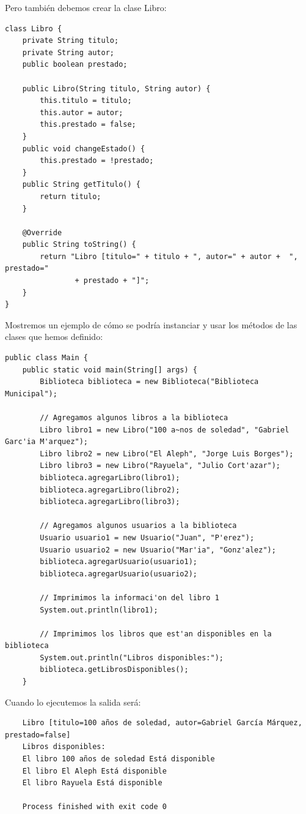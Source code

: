 \documentclass[executivepaper]{article}
\begin{document}
Pero también debemos crear la clase Libro:
\begin{lstlisting}
class Libro {
    private String titulo;
    private String autor;
    public boolean prestado;

    public Libro(String titulo, String autor) {
        this.titulo = titulo;
        this.autor = autor;
        this.prestado = false;
    }
    public void changeEstado() {
        this.prestado = !prestado;
    }
    public String getTitulo() {
        return titulo;
    }

    @Override
    public String toString() {
        return "Libro [titulo=" + titulo + ", autor=" + autor +  ", prestado="
                + prestado + "]";
    }
}
\end{lstlisting}

Mostremos un ejemplo de cómo se podría instanciar y usar los métodos de las clases que hemos definido:
\begin{lstlisting}
public class Main {
    public static void main(String[] args) {
        Biblioteca biblioteca = new Biblioteca("Biblioteca Municipal");

        // Agregamos algunos libros a la biblioteca
        Libro libro1 = new Libro("100 a~nos de soledad", "Gabriel Garc'ia M'arquez");
        Libro libro2 = new Libro("El Aleph", "Jorge Luis Borges");
        Libro libro3 = new Libro("Rayuela", "Julio Cort'azar");
        biblioteca.agregarLibro(libro1);
        biblioteca.agregarLibro(libro2);
        biblioteca.agregarLibro(libro3);

        // Agregamos algunos usuarios a la biblioteca
        Usuario usuario1 = new Usuario("Juan", "P'erez");
        Usuario usuario2 = new Usuario("Mar'ia", "Gonz'alez");
        biblioteca.agregarUsuario(usuario1);
        biblioteca.agregarUsuario(usuario2);

        // Imprimimos la informaci'on del libro 1
        System.out.println(libro1);

        // Imprimimos los libros que est'an disponibles en la biblioteca
        System.out.println("Libros disponibles:");
        biblioteca.getLibrosDisponibles();
    }
\end{lstlisting}
Cuando lo ejecutemos la salida será:
\begin{verbatim}
    Libro [titulo=100 años de soledad, autor=Gabriel García Márquez, prestado=false]
    Libros disponibles:
    El libro 100 años de soledad Está disponible
    El libro El Aleph Está disponible
    El libro Rayuela Está disponible

    Process finished with exit code 0
\end{verbatim}
\end{document}
